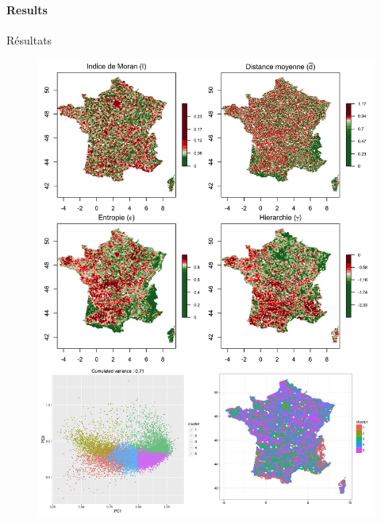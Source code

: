 
\paragraph{Results}{Résultats}






\begin{figure}
\includegraphics[width=0.9\linewidth]{Figures/Final/4-1-1-fig-staticcorrelations-empirical}

\end{figure}
